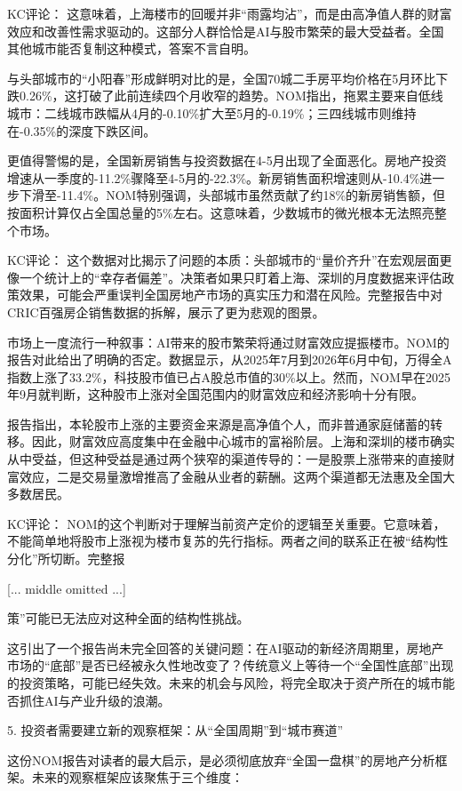 \documentclass[11pt]{ctexart}
\begin{document}
KC评论： 这意味着，上海楼市的回暖并非“雨露均沾”，而是由高净值人群的财富效应和改善性需求驱动的。这部分人群恰恰是AI与股市繁荣的最大受益者。全国其他城市能否复制这种模式，答案不言自明。

与头部城市的“小阳春”形成鲜明对比的是，全国70城二手房平均价格在5月环比下跌0.26\%，这打破了此前连续四个月收窄的趋势。NOM指出，拖累主要来自低线城市：二线城市跌幅从4月的-0.10\%扩大至5月的-0.19\%；三四线城市则维持在-0.35\%的深度下跌区间。

更值得警惕的是，全国新房销售与投资数据在4-5月出现了全面恶化。房地产投资增速从一季度的-11.2\%骤降至4-5月的-22.3\%。新房销售面积增速则从-10.4\%进一步下滑至-11.4\%。NOM特别强调，头部城市虽然贡献了约18\%的新房销售额，但按面积计算仅占全国总量的5\%左右。这意味着，少数城市的微光根本无法照亮整个市场。

KC评论： 这个数据对比揭示了问题的本质：头部城市的“量价齐升”在宏观层面更像一个统计上的“幸存者偏差”。决策者如果只盯着上海、深圳的月度数据来评估政策效果，可能会严重误判全国房地产市场的真实压力和潜在风险。完整报告中对CRIC百强房企销售数据的拆解，展示了更为悲观的图景。

市场上一度流行一种叙事：AI带来的股市繁荣将通过财富效应提振楼市。NOM的报告对此给出了明确的否定。数据显示，从2025年7月到2026年6月中旬，万得全A指数上涨了33.2\%，科技股市值已占A股总市值的30\%以上。然而，NOM早在2025年9月就判断，这种股市上涨对全国范围内的财富效应和经济影响十分有限。

报告指出，本轮股市上涨的主要资金来源是高净值个人，而非普通家庭储蓄的转移。因此，财富效应高度集中在金融中心城市的富裕阶层。上海和深圳的楼市确实从中受益，但这种受益是通过两个狭窄的渠道传导的：一是股票上涨带来的直接财富效应，二是交易量激增推高了金融从业者的薪酬。这两个渠道都无法惠及全国大多数居民。

KC评论： NOM的这个判断对于理解当前资产定价的逻辑至关重要。它意味着，不能简单地将股市上涨视为楼市复苏的先行指标。两者之间的联系正在被“结构性分化”所切断。完整报

[... middle omitted ...]

策”可能已无法应对这种全面的结构性挑战。

这引出了一个报告尚未完全回答的关键问题：在AI驱动的新经济周期里，房地产市场的“底部”是否已经被永久性地改变了？传统意义上等待一个“全国性底部”出现的投资策略，可能已经失效。未来的机会与风险，将完全取决于资产所在的城市能否抓住AI与产业升级的浪潮。

5. 投资者需要建立新的观察框架：从“全国周期”到“城市赛道”

这份NOM报告对读者的最大启示，是必须彻底放弃“全国一盘棋”的房地产分析框架。未来的观察框架应该聚焦于三个维度：
\end{document}

